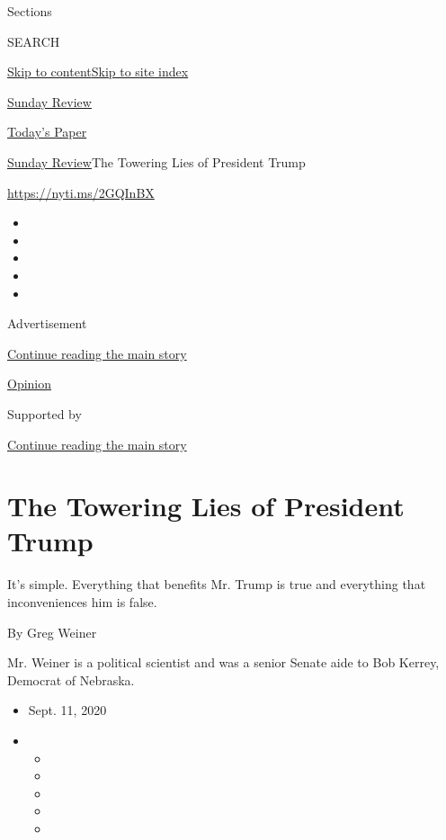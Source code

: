 Sections

SEARCH

\protect\hyperlink{site-content}{Skip to
content}\protect\hyperlink{site-index}{Skip to site index}

\href{https://www.nytimes3xbfgragh.onion/section/opinion/sunday}{Sunday
Review}

\href{https://myaccount.nytimes3xbfgragh.onion/auth/login?response_type=cookie\&client_id=vi}{}

\href{https://www.nytimes3xbfgragh.onion/section/todayspaper}{Today's
Paper}

\href{/section/opinion/sunday}{Sunday Review}\textbar{}The Towering Lies
of President Trump

\url{https://nyti.ms/2GQInBX}

\begin{itemize}
\item
\item
\item
\item
\item
\end{itemize}

Advertisement

\protect\hyperlink{after-top}{Continue reading the main story}

\href{/section/opinion}{Opinion}

Supported by

\protect\hyperlink{after-sponsor}{Continue reading the main story}

\hypertarget{the-towering-lies-of-president-trump}{%
\section{The Towering Lies of President
Trump}\label{the-towering-lies-of-president-trump}}

It's simple. Everything that benefits Mr. Trump is true and everything
that inconveniences him is false.

By Greg Weiner

Mr. Weiner is a political scientist and was a senior Senate aide to Bob
Kerrey, Democrat of Nebraska.

\begin{itemize}
\item
  Sept. 11, 2020
\item
  \begin{itemize}
  \item
  \item
  \item
  \item
  \item
  \end{itemize}
\end{itemize}

